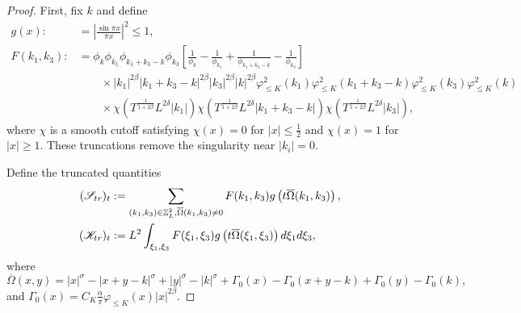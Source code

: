 \documentclass[10pt,a4paper]{amsart}
\def\dif{{\mathord{{\rm d}}}}
\def\geq{\geqslant}
\def\leq{\leqslant}
\begin{document}
\begin{proof}
First, fix $k$ and define \begin{align*}
    g(x):&=\left|\frac{\sin \pi x}{\pi x}\right|^2\leq 1,\\
    F(k_1,k_3):&=\phi_k \phi_{k_1} \phi_{k_1+k_3-k} \phi_{k_3}  \left[ \frac{1}{\phi_k} - \frac{1}{\phi_{k_1}} + \frac{1}{\phi_{k_1+k_3-k}} - \frac{1}{\phi_{k_3}} \right]\\
    &\quad\quad\times
 |k_1|^{2\beta}|k_1+k_3-k|^{2\beta}|k_3|^{2\beta}|k|^{2\beta}\varphi_{\leq K}^2(k_1)\varphi_{\leq K}^2(k_1+k_3-k)\varphi_{\leq K}^2(k_3)\varphi_{\leq K}^2(k)\\
 &\quad\quad \times \chi(T^{\frac{1}{1+2\beta}}L^{2\delta}|k_1|)\chi(T^{\frac{1}{1+2\beta}}L^{2\delta}|k_1+k_3-k|)\chi(T^{\frac{1}{1+2\beta}}L^{2\delta}|k_3|),
\end{align*}
where   $\chi$ is a smooth cutoff satisfying $\chi(x)=0$ for $|x|\leq \frac12$ and $\chi(x)=1$ for $|x|\geq 1$. These truncations remove the singularity near $|k_i|=0$. 

Define the truncated quantities
\begin{align*}
   (\mathscr S_{\rm tr})_t&:=\sum_{(k_1, k_3)\in \mathbb{Z}_L^{2},\overline\Omega(k_1,k_3)\neq 0}F(k_1,k_3) g\left(t\overline \Omega(k_1,k_3)\right),\\
 (\mathscr K_{\rm tr})_t&:=L^{2} \int_{\xi_1,\xi_3}F(\xi_1,\xi_3) g\left(t\overline \Omega(\xi_1,\xi_3)\right)\dif \xi_1\dif \xi_3,
\end{align*}
where
$$\overline\Omega(x,y) =|x|^\sigma-|x+y-k|^\sigma+|y|^\sigma-|k|^\sigma+\Gamma_0(x)-\Gamma_0(x+y-k)+\Gamma_0(y)-\Gamma_0(k),$$
and
$ \Gamma_0(x)=C_K\frac{\alpha }{\pi }\varphi_{\leq K}(x)|x|^{2\beta}.$


\end{proof}
\end{document}
